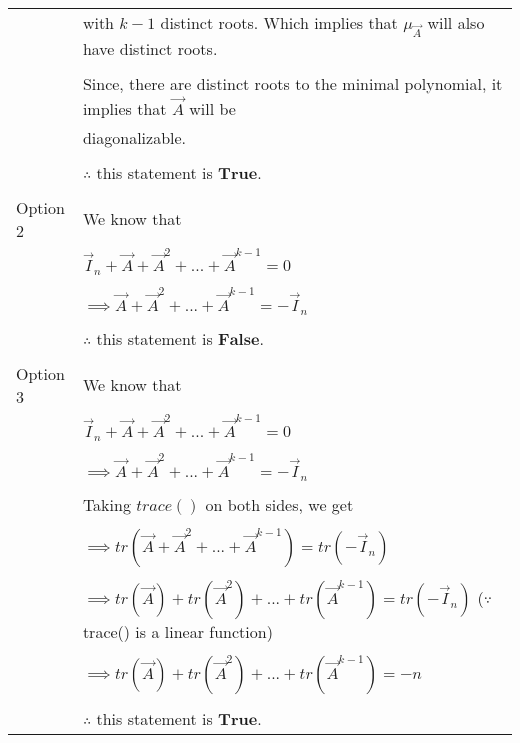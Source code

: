 \begin{longtable}{|l|l|}
		& with $k-1$ distinct roots. Which implies that $\mu_{\vec{A}}$ will also have distinct roots. \\
		& \\
		& Since, there are distinct roots to the minimal polynomial, it implies that $\vec{A}$ will be \\ 
		& diagonalizable. \\
		& \\
		& $\therefore$ this statement is $\mathbf{True}$. \\
		&\\
		\hline
		\multirow{3}{*}{Option 2} & \\
		& We know that \\
		& \\
		& \qquad \qquad \qquad $\vec{I}_n + \vec{A} + \vec{A}^2 + ... + \vec{A}^{k-1} = 0$ \\
		& \\
		& \qquad \qquad $\implies \vec{A} + \vec{A}^2 + ... + \vec{A}^{k-1} = -\vec{I}_n$ \\
		& \\
		& $\therefore$ this statement is $\mathbf{False}$. \\
		&\\
		\hline
		\multirow{3}{*}{Option 3} & \\
		& We know that \\
		& \\
		& \qquad \qquad \qquad $\vec{I}_n + \vec{A} + \vec{A}^2 + ... + \vec{A}^{k-1} = 0$ \\
		& \\
		& \qquad \qquad $\implies \vec{A} + \vec{A}^2 + ... + \vec{A}^{k-1} = -\vec{I}_n$ \\
		& \\
		& Taking $trace()$ on both sides, we get \\
		& \\
		& \qquad \qquad $\implies tr(\vec{A} + \vec{A}^2 + ... + \vec{A}^{k-1}) = tr(-\vec{I}_n)$ \\
		& \\
		& \qquad \qquad $\implies tr(\vec{A}) + tr(\vec{A}^2) + ... + tr(\vec{A}^{k-1}) = tr(-\vec{I}_n)$ \qquad ($\because$ trace() is a linear function)\\
		& \\
		& \qquad \qquad $\implies tr(\vec{A}) + tr(\vec{A}^2) + ... + tr(\vec{A}^{k-1}) = -n$ \\
		& \\
		& $\therefore$ this statement is $\mathbf{True}$. \\

\end{longtable}
